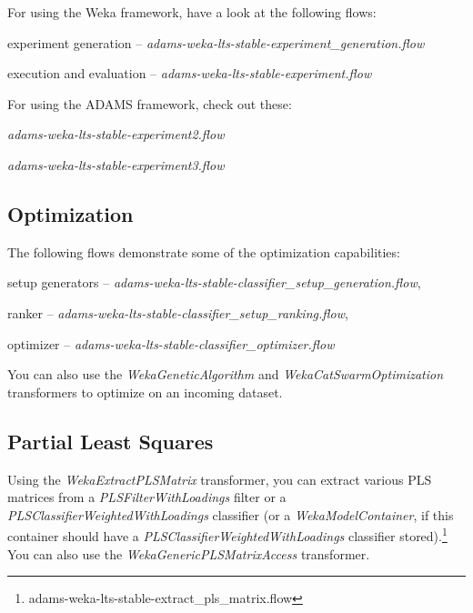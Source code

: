 For using the Weka framework, have a look at the following flows:
\begin{tight_itemize}
  \item experiment generation -- \textit{adams-weka-lts-stable-experiment\_generation.flow}
  \item execution and evaluation -- \textit{adams-weka-lts-stable-experiment.flow}
\end{tight_itemize}

For using the ADAMS framework, check out these:
\begin{tight_itemize}
  \item \textit{adams-weka-lts-stable-experiment2.flow}
  \item \textit{adams-weka-lts-stable-experiment3.flow}
\end{tight_itemize}

\subsection{Optimization}
The following flows demonstrate some of the optimization capabilities:
\begin{tight_itemize}
  \item setup generators -- \textit{adams-weka-lts-stable-classifier\_setup\_generation.flow},
  \item ranker -- \textit{adams-weka-lts-stable-classifier\_setup\_ranking.flow},
  \item optimizer -- \textit{adams-weka-lts-stable-classifier\_optimizer.flow}
\end{tight_itemize}

You can also use the \textit{WekaGeneticAlgorithm} and
\textit{WekaCatSwarmOptimization} transformers to optimize on an incoming
dataset.

\subsection{Partial Least Squares}
Using the \textit{WekaExtractPLSMatrix} transformer, you can extract various
PLS matrices from a \textit{PLSFilterWithLoadings} filter or a 
\textit{PLSClassifierWeightedWithLoadings} classifier (or a \textit{WekaModelContainer},
if this container should have a \textit{PLSClassifierWeightedWithLoadings} classifier 
stored).\footnote{adams-weka-lts-stable-extract\_pls\_matrix.flow}
You can also use the \textit{WekaGenericPLSMatrixAccess} transformer.